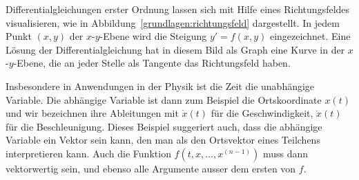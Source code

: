Differentialgleichungen erster Ordnung lassen sich mit Hilfe eines
Richtungsfeldes visualisieren, wie in Abbildung~\ref{grundlagen:richtungsfeld}
dargestellt.
%
In jedem Punkt $(x,y)$ der $x$-$y$-Ebene wird die Steigung $y'=f(x,y)$
eingezeichnet.
Eine Lösung der Differentialgleichung hat in diesem Bild als Graph
eine Kurve in der $x$-$y$-Ebene, die an jeder Stelle als Tangente 
das Richtungsfeld haben.

Insbesondere in Anwendungen in der Physik ist die Zeit die
unabhängige Variable.
Die abhängige Variable ist dann zum Beispiel die Ortskoordinate
$x(t)$ und wir bezeichnen ihre Ableitungen mit $\dot{x}(t)$ für
die Geschwindigkeit, $\ddot{x}(t)$ für die Beschleunigung.
Dieses Beispiel suggeriert auch, dass die abhängige Variable 
ein Vektor sein kann, den man als den Ortsvektor eines Teilchens
interpretieren kann.
Auch die Funktion $f(t,x,\dots,x^{(n-1)})$ muss dann vektorwertig sein, und
ebenso alle Argumente ausser dem ersten von $f$.

